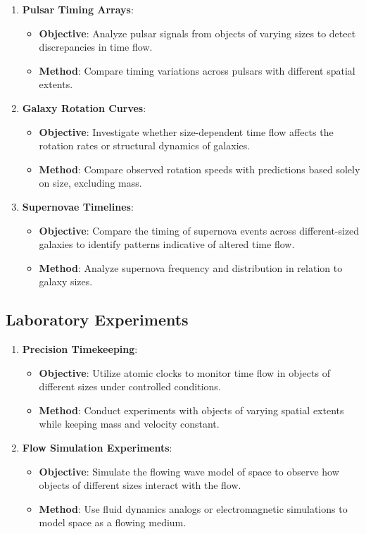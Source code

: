 \documentclass[12pt]{article}
\begin{document}
\begin{enumerate}
    \item \textbf{Pulsar Timing Arrays}:
    \begin{itemize}
        \item \textbf{Objective}: Analyze pulsar signals from objects of varying sizes to detect discrepancies in time flow.
        \item \textbf{Method}: Compare timing variations across pulsars with different spatial extents.
    \end{itemize}
    
    \item \textbf{Galaxy Rotation Curves}:
    \begin{itemize}
        \item \textbf{Objective}: Investigate whether size-dependent time flow affects the rotation rates or structural dynamics of galaxies.
        \item \textbf{Method}: Compare observed rotation speeds with predictions based solely on size, excluding mass.
    \end{itemize}
    
    \item \textbf{Supernovae Timelines}:
    \begin{itemize}
        \item \textbf{Objective}: Compare the timing of supernova events across different-sized galaxies to identify patterns indicative of altered time flow.
        \item \textbf{Method}: Analyze supernova frequency and distribution in relation to galaxy sizes.
    \end{itemize}
\end{enumerate}

\subsection{Laboratory Experiments}

\begin{enumerate}
    \item \textbf{Precision Timekeeping}:
    \begin{itemize}
        \item \textbf{Objective}: Utilize atomic clocks to monitor time flow in objects of different sizes under controlled conditions.
        \item \textbf{Method}: Conduct experiments with objects of varying spatial extents while keeping mass and velocity constant.
    \end{itemize}
    
    \item \textbf{Flow Simulation Experiments}:
    \begin{itemize}
        \item \textbf{Objective}: Simulate the flowing wave model of space to observe how objects of different sizes interact with the flow.
        \item \textbf{Method}: Use fluid dynamics analogs or electromagnetic simulations to model space as a flowing medium.
    \end{itemize}
\end{enumerate}
\end{document}
